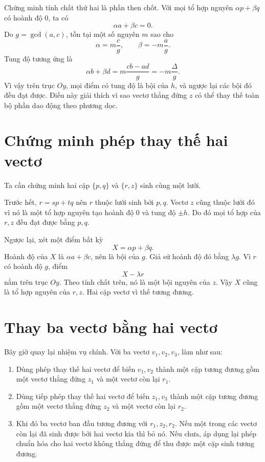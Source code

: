 \documentclass[11pt]{article}
\begin{document}
Chứng minh tính chất thứ hai là phần then chốt. Với mọi tổ hợp nguyên
\(\alpha p+\beta q\) có hoành độ \(0\), ta có
\[
  \alpha a+\beta c=0.
\]
Do \(g=\gcd(a,c)\), tồn tại một số nguyên \(m\) sao cho
\[
  \alpha=m\frac{c}{g},\qquad
  \beta=-m\frac{a}{g}.
\]
Tung độ tương ứng là
\[
  \alpha b+\beta d
  =
  m\frac{cb-ad}{g}
  =
  -m\frac{\Delta}{g}.
\]
Vì vậy trên trục \(Oy\), mọi điểm có tung độ là bội của \(h\), và ngược lại
các bội đó đều đạt được. Điều này giải thích vì sao vectơ thẳng đứng \(z\) có
thể thay thế toàn bộ phần dao động theo phương dọc.

\section{Chứng minh phép thay thế hai vectơ}

Ta cần chứng minh hai cặp \(\{p,q\}\) và \(\{r,z\}\) sinh cùng một lưới.

Trước hết, \(r=sp+tq\) nên \(r\) thuộc lưới sinh bởi \(p,q\). Vectơ \(z\) cũng
thuộc lưới đó vì nó là một tổ hợp nguyên tạo hoành độ \(0\) và tung độ
\(\pm h\). Do đó mọi tổ hợp của \(r,z\) đều đạt được bằng \(p,q\).

Ngược lại, xét một điểm bất kỳ
\[
  X=\alpha p+\beta q.
\]
Hoành độ của \(X\) là \(\alpha a+\beta c\), nên là bội của \(g\). Giả sử
hoành độ đó bằng \(\lambda g\). Vì \(r\) có hoành độ \(g\), điểm
\[
  X-\lambda r
\]
nằm trên trục \(Oy\). Theo tính chất trên, nó là một bội nguyên của \(z\).
Vậy \(X\) cũng là tổ hợp nguyên của \(r,z\). Hai cặp vectơ vì thế tương đương.

\section{Thay ba vectơ bằng hai vectơ}

Bây giờ quay lại nhiệm vụ chính. Với ba vectơ \(v_1,v_2,v_3\), làm như sau:

\begin{enumerate}
  \item Dùng phép thay thế hai vectơ để biến \(v_1,v_2\) thành một cặp tương
  đương gồm một vectơ thẳng đứng \(z_1\) và một vectơ còn lại \(r_1\).
  \item Dùng tiếp phép thay thế hai vectơ để biến \(z_1,v_3\) thành một cặp
  tương đương gồm một vectơ thẳng đứng \(z_2\) và một vectơ còn lại \(r_2\).
  \item Khi đó ba vectơ ban đầu tương đương với \(r_1,z_2,r_2\). Nếu một trong
  các vectơ còn lại đã sinh được bởi hai vectơ kia thì bỏ nó. Nếu chưa, áp
  dụng lại phép chuẩn hóa cho hai vectơ không thẳng đứng để thu được một cặp
  sinh tương đương.
\end{enumerate}
\end{document}
